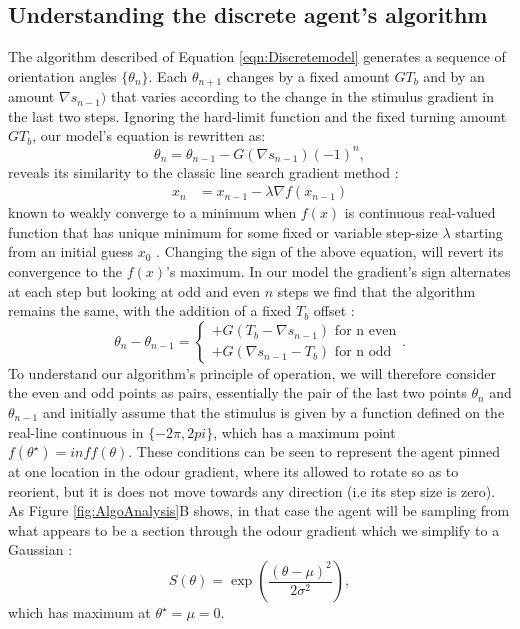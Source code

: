 \documentclass[10pt,a4paper]{article}
\begin{document}
\subsection{Understanding the discrete agent's algorithm}
\label{sec:AlgoExplain}
The algorithm described of Equation \eqref{eqn:Discretemodel} generates a sequence of orientation angles $\{\theta_n\}$. Each $\theta_{n+1}$ changes by a fixed amount $G T_b$ and by an amount $\nabla s_{n-1})$ that varies according to the change in the stimulus gradient in the last two steps.
 Ignoring the hard-limit function and the fixed turning amount $G T_b$, our model's equation is rewritten as:
\begin{equation}
 \theta_n = \theta_{n-1} - G (\nabla s_{n-1}){(-1)}^n,
\end{equation}
reveals its similarity to the classic line search gradient method :
\begin{align}
x_n &= x_{n-1} - \lambda \nabla f(x_{n-1})
\label{eqn:graddescent}
\end{align}
known to weakly converge to a minimum when $f(x)$ is continuous real-valued function that has unique minimum for some fixed or variable step-size $\lambda$ starting from an initial guess $x_0$ \citep{armijo1966minimization}. Changing the sign of the above equation, will revert its convergence to the $f(x)$'s maximum. In our model the gradient's sign alternates at each step but looking at odd and even $n$ steps we find that the algorithm remains the same, with the addition of a fixed $T_b$ offset :
\begin{equation}
\theta_n - \theta_{n-1} = 
\begin{cases}
+G (T_b - \nabla s_{n-1}) \mbox { for n even}\\
+G (\nabla s_{n-1}-T_b) \mbox { for n odd}
\end{cases}.
\label{eq:oddevenPairs}
\end{equation}
 To understand our algorithm's principle of operation, we will therefore consider the even and odd points as pairs, essentially the pair of the last two points $\theta_n$ and $\theta_{n-1}$ and  initially assume that the stimulus is given by a function defined on the real-line continuous in $\{-2 \pi , 2 pi\}$, which has a maximum point $f(\theta^\star)=inf f(\theta)$.
  These conditions can be seen to represent the agent pinned at one location in the odour gradient, where its allowed to rotate so as to reorient, but it is does not move towards any direction (i.e its step size is zero). As Figure \ref{fig:AlgoAnalysis}B shows, in that case the agent will be sampling from what appears to be a section through the odour gradient which we simplify to a Gaussian :
\begin{equation}
S(\theta) = \exp\left({\frac{(\theta-\mu)^2}{2 \sigma^2}}\right),
\end{equation}
which has maximum at $\theta^\star = \mu =0$.
\end{document}
